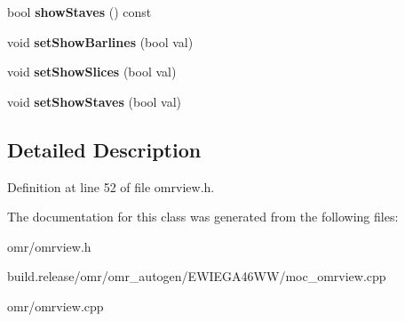 \begin{DoxyCompactItemize}
bool {\bfseries show\+Staves} () const
\item 
\mbox{\label{class_ms_1_1_omr_view_a0cb0aef1594c0cdf830ff3e91904680a}} 
void {\bfseries set\+Show\+Barlines} (bool val)
\item 
\mbox{\label{class_ms_1_1_omr_view_acb15e0a940a329db33713c15d8088187}} 
void {\bfseries set\+Show\+Slices} (bool val)
\item 
\mbox{\label{class_ms_1_1_omr_view_ab174c7bf6f4f97c541672ee4dbd4aa0c}} 
void {\bfseries set\+Show\+Staves} (bool val)
\end{DoxyCompactItemize}


\subsection{Detailed Description}


Definition at line 52 of file omrview.\+h.



The documentation for this class was generated from the following files\+:\begin{DoxyCompactItemize}
\item 
omr/omrview.\+h\item 
build.\+release/omr/omr\+\_\+autogen/\+E\+W\+I\+E\+G\+A46\+W\+W/moc\+\_\+omrview.\+cpp\item 
omr/omrview.\+cpp\end{DoxyCompactItemize}
